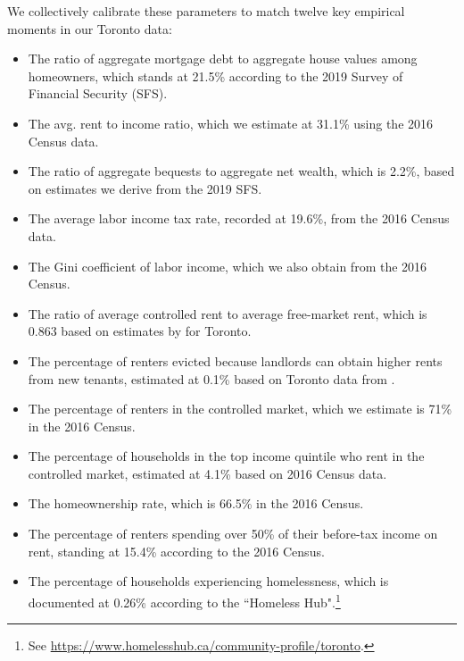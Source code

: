\documentclass[parskip=full]{article}
\begin{document}
We collectively calibrate these parameters to match twelve key empirical moments in our Toronto data:

\begin{itemize}
    \item The ratio of aggregate mortgage debt to aggregate house values among homeowners, which stands at 21.5\% according to the 2019 Survey of Financial Security (SFS).
    \item The avg. rent to income ratio, which we estimate at 31.1\% using the 2016 Census data.
    \item The ratio of aggregate bequests to aggregate net wealth, which is 2.2\%, based on estimates we derive from the 2019 SFS.
    \item The average labor income tax rate, recorded at 19.6\%, from the 2016 Census data.
    \item The Gini coefficient of labor income, which we also obtain from the 2016 Census.
    \item The ratio of average controlled rent to average free-market rent, which is 0.863 based on estimates by \citet{zhang-gou} for Toronto.
    \item The percentage of renters evicted because landlords can obtain higher rents from new tenants, estimated at 0.1\% based on Toronto data from \citet{LeonIveniuk2020}.
    \item The percentage of renters in the controlled market, which we estimate is 71\% in the 2016 Census.
    \item The percentage of households in the top income quintile who rent in the controlled market, estimated at 4.1\% based on 2016 Census data.
    \item The homeownership rate, which is 66.5\% in the 2016 Census.
    \item The percentage of renters spending over 50\% of their before-tax income on rent, standing at 15.4\% according to the 2016 Census.
    \item The percentage of households experiencing homelessness, which is documented at 0.26\% according to the ``Homeless Hub".\footnote{See \url{https://www.homelesshub.ca/community-profile/toronto}.}
\end{itemize}
\end{document}
